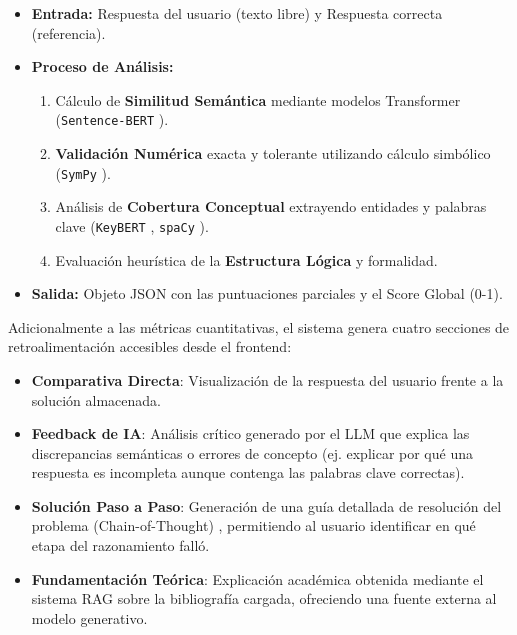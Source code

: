\documentclass[12pt, a4paper]{article}
\begin{document}
\begin{itemize}
    \item \textbf{Entrada:} Respuesta del usuario (texto libre) y Respuesta correcta (referencia).
    \item \textbf{Proceso de Análisis:}
        \begin{enumerate}
            \item Cálculo de \textbf{Similitud Semántica} mediante modelos Transformer (\texttt{Sentence-BERT} \cite{sentencebert}).
            \item \textbf{Validación Numérica} exacta y tolerante utilizando cálculo simbólico (\texttt{SymPy} \cite{sympy}).
            \item Análisis de \textbf{Cobertura Conceptual} extrayendo entidades y palabras clave (\texttt{KeyBERT} \cite{keybert}, \texttt{spaCy} \cite{spacy}).
            \item Evaluación heurística de la \textbf{Estructura Lógica} y formalidad.
        \end{enumerate}
    \item \textbf{Salida:} Objeto JSON con las puntuaciones parciales y el Score Global (0-1).
\end{itemize}

Adicionalmente a las métricas cuantitativas, el sistema genera cuatro secciones de retroalimentación accesibles desde el frontend:
\begin{itemize}
    \item \textbf{Comparativa Directa}: Visualización de la respuesta del usuario frente a la solución almacenada.
    \item \textbf{Feedback de IA}: Análisis crítico generado por el LLM que explica las discrepancias semánticas o errores de concepto (ej. explicar por qué una respuesta es incompleta aunque contenga las palabras clave correctas).
    \item \textbf{Solución Paso a Paso}: Generación de una guía detallada de resolución del problema (Chain-of-Thought) \cite{cot}, permitiendo al usuario identificar en qué etapa del razonamiento falló.
    \item \textbf{Fundamentación Teórica}: Explicación académica obtenida mediante el sistema RAG \cite{geminiRag} sobre la bibliografía cargada, ofreciendo una fuente externa al modelo generativo.
\end{itemize}
\end{document}
